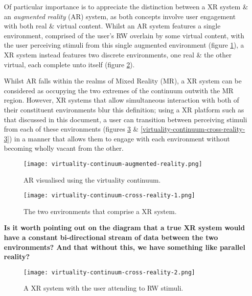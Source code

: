 Of particular importance is to appreciate the distinction between a XR system \& an \textit{augmented reality} (AR) system, as both concepts involve user engagement with both real \& virtual content. Whilst an AR system features a single environment, comprised of the user's RW overlain by some virtual content, with the user perceiving stimuli from this single augmented environment (figure \ref{virtuality-continuum-augmented-reality}), a XR system instead features two discrete environments, one real \& the other virtual, each complete unto itself (figure \ref{virtuality-continuum-cross-reality-1}).

Whilst AR falls within the realms of Mixed Reality (MR), a XR system can be considered as occupying the two extremes of the continuum outwith the MR region. However, XR systems that allow simultaneous interaction with both of their constituent environments blur this definition; using a XR platform such as that discussed in this document, a user can transition between perceiving stimuli from each of these environments (figures \ref{virtuality-continuum-cross-reality-2} \& \ref{virtuality-continuum-cross-reality-3}) in a manner that allows them to engage with each environment without becoming wholly vacant from the other.

\begin{figure}[h]
	\begin{center}
		\texttt{[image: virtuality-continuum-augmented-reality.png]}
		\caption{AR visualised using the virtuality continuum.}
		\label{virtuality-continuum-augmented-reality}
	\end{center}
\end{figure}

\begin{figure}[h]
	\begin{center}
		\texttt{[image: virtuality-continuum-cross-reality-1.png]}
		\caption{The two environments that comprise a XR system.}
		\label{virtuality-continuum-cross-reality-1}
	\end{center}
\end{figure}

\textbf{Is it worth pointing out on the diagram that a true XR system would have a constant bi-directional stream of data between the two environments? And that without this, we have something like parallel reality?}

\begin{figure}[h]
	\begin{center}
		\texttt{[image: virtuality-continuum-cross-reality-2.png]}
		\caption{A XR system with the user attending to RW stimuli.}
		\label{virtuality-continuum-cross-reality-2}
	\end{center}
\end{figure}

